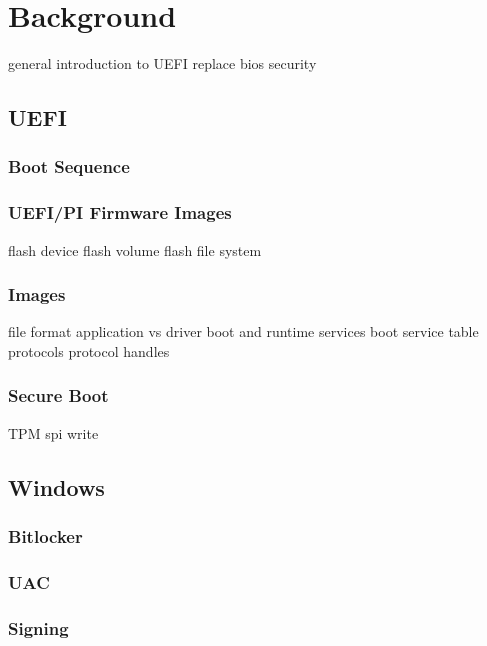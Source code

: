 %
\chapter{Background}

general introduction to UEFI
replace bios
security

\section{UEFI}
\subsection{Boot Sequence}

\subsection{UEFI/PI Firmware Images}
flash device
flash volume
flash file system

\subsection{Images}
file format
application vs driver
boot and runtime services
boot service table
protocols
protocol handles

\subsection{Secure Boot}
TPM
spi write


\section{Windows}
\subsection{Bitlocker}
\subsection{UAC}
\subsection{Signing}



